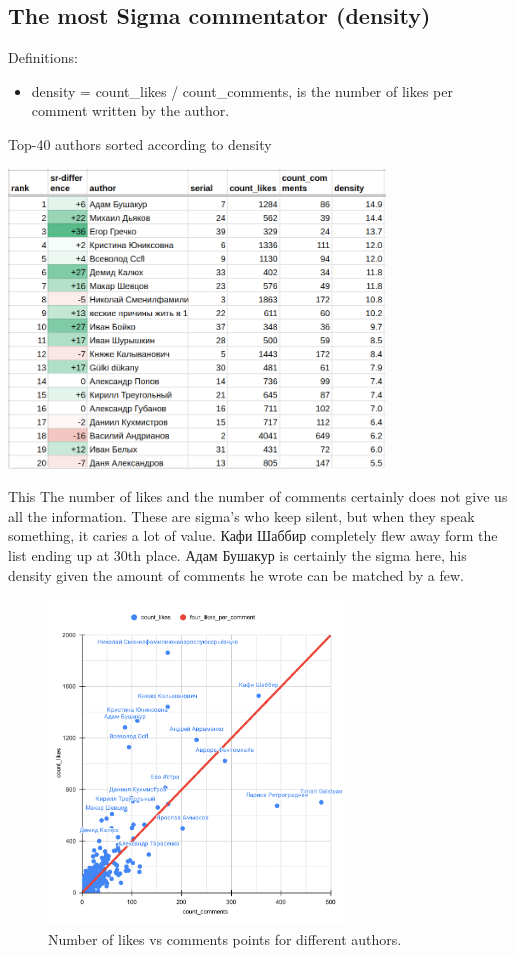 \documentclass[
	11pt
] {article}
\begin{document}
\subsection{The most Sigma commentator (density)}
	Definitions:
	\begin{itemize}
		\item density = count\_likes / count\_comments, is the number of likes per comment written by the author.
	\end{itemize}

	\begin{table}[H]
		\centering
		\caption{Top-40 authors sorted according to density \cite{sheet-density}}
		\label{table-density}
		\includegraphics[width=0.75\textwidth]{table-density}
	\end{table}

	This The number of likes and the number of comments certainly does not give us all the information. These are sigma's who keep silent, but when they speak something, it caries a lot of value. Кафи Шаббир completely flew away form the list ending up at 30th place. Адам Бушакур is certainly the sigma here, his density given the amount of comments he wrote can be matched by a few.

	\begin{figure}[H]
		\centering
		\includegraphics[width=0.7\textwidth]{fig-count-likes-comments-author-points}
		\caption{Number of likes vs comments points for different authors.}
		\label{fig-count-likes-comments-author-points}
	\end{figure}
\end{document}
